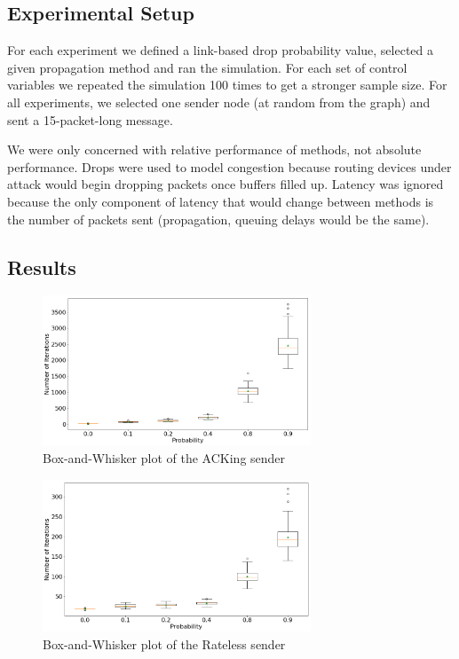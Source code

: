 \subsection{Experimental Setup}
For each experiment we defined a link-based drop probability value, selected a given propagation method and ran the simulation. For each set of control variables we repeated the simulation 100 times to get a stronger sample size. For all experiments, we selected one sender node (at random from the graph) and sent a 15-packet-long message.

We were only concerned with relative performance of methods, not absolute performance. Drops were used to model congestion because routing devices under attack would begin dropping packets once buffers filled up. Latency was ignored because the only component of latency that would change between methods is the number of packets sent (propagation, queuing delays would be the same).

\subsection{Results}

\begin{figure}[tp]
\centering
\noindent
\includegraphics[width=8cm]{figures/big_font/ack_trim.png}
\caption{Box-and-Whisker plot of the ACKing sender }
\label{graph:ack}
\end{figure}

\begin{figure}[tp]
\centering
\noindent
\includegraphics[width=8cm]{figures/big_font/rateless_trim.png}
\caption{Box-and-Whisker plot of the Rateless sender}
\label{graph:rateless}
\end{figure}


